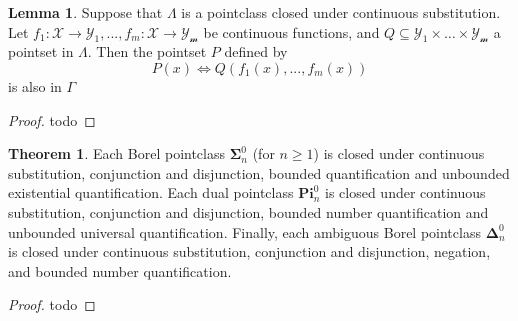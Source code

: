 \documentclass{article}
\theoremstyle{definition}
\newtheorem{lemma}{Lemma}[section]
\newtheorem{theorem}{Theorem}[section]
\theoremstyle{plain}
\begin{document}
\begin{lemma}
	Suppose that $\Lambda$ is a pointclass closed under continuous substitution. Let $f_1:\mathcal{X} \to \mathcal{Y_1},...,f_m:\mathcal{X}\to \mathcal{Y_m}$ be continuous functions, and $Q \subseteq \mathcal{Y_1} \times \ldots \times \mathcal{Y_m}$ a pointset in $\Lambda$. Then the pointset $P$ defined by 
	\[P(x) \iff Q(f_1(x),...,f_m(x)) \]
is also in $\Gamma$
\end{lemma}
\begin{proof}
	todo
\end{proof}

\begin{theorem}
	Each Borel pointclass $\bm{\Sigma}^0_n$ (for $n \geq 1$) is closed under continuous substitution, conjunction and disjunction, bounded quantification and unbounded existential quantification. Each dual pointclass $\bm{Pi}_n^0$ is closed under continuous substitution, conjunction and disjunction, bounded number quantification and unbounded universal quantification. Finally, each ambiguous Borel pointclass $\bm{\Delta}_n^0$ is closed under continuous substitution, conjunction and disjunction, negation, and bounded number quantification.
\end{theorem}
\begin{proof}
	todo
\end{proof}
\end{document}
